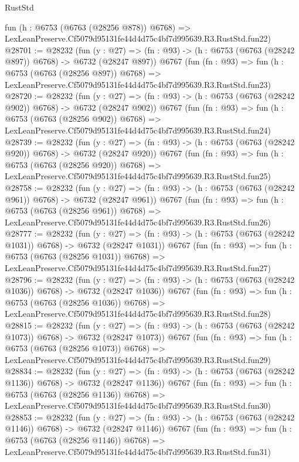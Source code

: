 \begin{lexlean}{RustStd}
\begin{coremodule}
    fun (h : @6753 (@6763 (@28256 @878)) @6768) =>
    LexLeanPreserve.Cf5079d95131fe44d4d75c4bf7d995639.R3.RustStd.fun22)
@28701 := @28232
    (fun (y : @27) => (fn : @93) -> (h : @6753 (@6763 (@28242 @897)) @6768) -> @6732 (@28247 @897))
    @6767
    (fun (fn : @93) =>
    fun (h : @6753 (@6763 (@28256 @897)) @6768) =>
    LexLeanPreserve.Cf5079d95131fe44d4d75c4bf7d995639.R3.RustStd.fun23)
@28720 := @28232
    (fun (y : @27) => (fn : @93) -> (h : @6753 (@6763 (@28242 @902)) @6768) -> @6732 (@28247 @902))
    @6767
    (fun (fn : @93) =>
    fun (h : @6753 (@6763 (@28256 @902)) @6768) =>
    LexLeanPreserve.Cf5079d95131fe44d4d75c4bf7d995639.R3.RustStd.fun24)
@28739 := @28232
    (fun (y : @27) => (fn : @93) -> (h : @6753 (@6763 (@28242 @920)) @6768) -> @6732 (@28247 @920))
    @6767
    (fun (fn : @93) =>
    fun (h : @6753 (@6763 (@28256 @920)) @6768) =>
    LexLeanPreserve.Cf5079d95131fe44d4d75c4bf7d995639.R3.RustStd.fun25)
@28758 := @28232
    (fun (y : @27) => (fn : @93) -> (h : @6753 (@6763 (@28242 @961)) @6768) -> @6732 (@28247 @961))
    @6767
    (fun (fn : @93) =>
    fun (h : @6753 (@6763 (@28256 @961)) @6768) =>
    LexLeanPreserve.Cf5079d95131fe44d4d75c4bf7d995639.R3.RustStd.fun26)
@28777 := @28232
    (fun (y : @27) =>
    (fn : @93) -> (h : @6753 (@6763 (@28242 @1031)) @6768) -> @6732 (@28247 @1031))
    @6767
    (fun (fn : @93) =>
    fun (h : @6753 (@6763 (@28256 @1031)) @6768) =>
    LexLeanPreserve.Cf5079d95131fe44d4d75c4bf7d995639.R3.RustStd.fun27)
@28796 := @28232
    (fun (y : @27) =>
    (fn : @93) -> (h : @6753 (@6763 (@28242 @1036)) @6768) -> @6732 (@28247 @1036))
    @6767
    (fun (fn : @93) =>
    fun (h : @6753 (@6763 (@28256 @1036)) @6768) =>
    LexLeanPreserve.Cf5079d95131fe44d4d75c4bf7d995639.R3.RustStd.fun28)
@28815 := @28232
    (fun (y : @27) =>
    (fn : @93) -> (h : @6753 (@6763 (@28242 @1073)) @6768) -> @6732 (@28247 @1073))
    @6767
    (fun (fn : @93) =>
    fun (h : @6753 (@6763 (@28256 @1073)) @6768) =>
    LexLeanPreserve.Cf5079d95131fe44d4d75c4bf7d995639.R3.RustStd.fun29)
@28834 := @28232
    (fun (y : @27) =>
    (fn : @93) -> (h : @6753 (@6763 (@28242 @1136)) @6768) -> @6732 (@28247 @1136))
    @6767
    (fun (fn : @93) =>
    fun (h : @6753 (@6763 (@28256 @1136)) @6768) =>
    LexLeanPreserve.Cf5079d95131fe44d4d75c4bf7d995639.R3.RustStd.fun30)
@28853 := @28232
    (fun (y : @27) =>
    (fn : @93) -> (h : @6753 (@6763 (@28242 @1146)) @6768) -> @6732 (@28247 @1146))
    @6767
    (fun (fn : @93) =>
    fun (h : @6753 (@6763 (@28256 @1146)) @6768) =>
    LexLeanPreserve.Cf5079d95131fe44d4d75c4bf7d995639.R3.RustStd.fun31)

\end{coremodule}
\end{lexlean}
